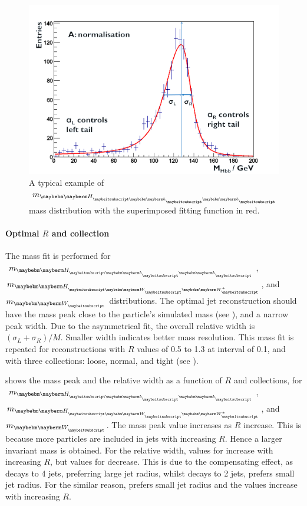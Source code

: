 \begin{figure}[!htbp]
\includegraphics[width=\largefigwidth]{doubleHiggs/MCmassFit}
\caption[Example MC mass fit for jet optimisation in double Higgs analysis]%
   {A typical example of  $m_{\Hbb}$  mass distribution with the superimposed fitting function in red.}
   \label{fig:doubleHiggsFitMCMass}
\end{figure}

\paragraph{Optimal $R$ and \PFO collection}

The mass fit is performed for $m_{\Hbb}$, $m_{\HWW}$, and $m_{\PW}$ distributions.  The optimal jet reconstruction should have the mass peak close to the particle's simulated mass (see \Section{}), and a narrow peak width. Due to the asymmetrical fit, the overall relative width is $\left(\sigma_L  + \sigma_R\right)/M$. Smaller width indicates better mass resolution. This mass fit is repeated for reconstructions with $R$ values of 0.5 to 1.3 at interval of 0.1, and with three \PFO collections: loose, normal, and tight (see ).



 shows the mass peak and the relative width as a function of $R$ and \PFO collections, for $m_{\Hbb}$, $m_{\HWW}$, and $m_{\PW}$. The mass peak value increases as $R$ increase. This is because more particles are included in jets with increasing $R$. Hence a larger invariant mass is obtained. For the relative width,  values for \Hbb increase with increasing $R$, but values for \HWW decrease. This is due to the compensating  effect, as \HWW decays to 4 jets, preferring large jet radius, whilst \Hbb decays to 2 jets, prefers small jet radius. For the similar reason, \PW prefers small jet radius and the values increase with increasing $R$.

